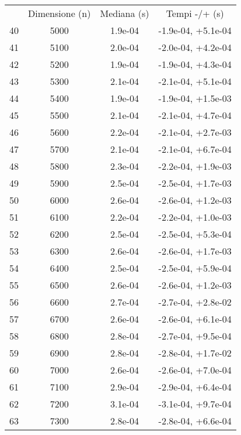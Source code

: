 \begin{table}
\centering
\begin{adjustbox}{width=1\textwidth/2}
\begin{tabular}{|c|c|c|c|}
\hline
 & Dimensione (n) & Mediana (s) & Tempi -/+ (s) \\
40 & 5000 & 1.9e-04 & -1.9e-04, +5.1e-04 \\
\cline{1-4}
41 & 5100 & 2.0e-04 & -2.0e-04, +4.2e-04 \\
\cline{1-4}
42 & 5200 & 1.9e-04 & -1.9e-04, +4.3e-04 \\
\cline{1-4}
43 & 5300 & 2.1e-04 & -2.1e-04, +5.1e-04 \\
\cline{1-4}
44 & 5400 & 1.9e-04 & -1.9e-04, +1.5e-03 \\
\cline{1-4}
45 & 5500 & 2.1e-04 & -2.1e-04, +4.7e-04 \\
\cline{1-4}
46 & 5600 & 2.2e-04 & -2.1e-04, +2.7e-03 \\
\cline{1-4}
47 & 5700 & 2.1e-04 & -2.1e-04, +6.7e-04 \\
\cline{1-4}
48 & 5800 & 2.3e-04 & -2.2e-04, +1.9e-03 \\
\cline{1-4}
49 & 5900 & 2.5e-04 & -2.5e-04, +1.7e-03 \\
\cline{1-4}
50 & 6000 & 2.6e-04 & -2.6e-04, +1.2e-03 \\
\cline{1-4}
51 & 6100 & 2.2e-04 & -2.2e-04, +1.0e-03 \\
\cline{1-4}
52 & 6200 & 2.5e-04 & -2.5e-04, +5.3e-04 \\
\cline{1-4}
53 & 6300 & 2.6e-04 & -2.6e-04, +1.7e-03 \\
\cline{1-4}
54 & 6400 & 2.5e-04 & -2.5e-04, +5.9e-04 \\
\cline{1-4}
55 & 6500 & 2.6e-04 & -2.6e-04, +1.2e-03 \\
\cline{1-4}
56 & 6600 & 2.7e-04 & -2.7e-04, +2.8e-02 \\
\cline{1-4}
57 & 6700 & 2.6e-04 & -2.6e-04, +6.1e-04 \\
\cline{1-4}
58 & 6800 & 2.8e-04 & -2.7e-04, +9.5e-04 \\
\cline{1-4}
59 & 6900 & 2.8e-04 & -2.8e-04, +1.7e-02 \\
\cline{1-4}
60 & 7000 & 2.6e-04 & -2.6e-04, +7.0e-04 \\
\cline{1-4}
61 & 7100 & 2.9e-04 & -2.9e-04, +6.4e-04 \\
\cline{1-4}
62 & 7200 & 3.1e-04 & -3.1e-04, +9.7e-04 \\
\cline{1-4}
63 & 7300 & 2.8e-04 & -2.8e-04, +6.6e-04 \\

\end{tabular}
\end{adjustbox}
\end{table}
